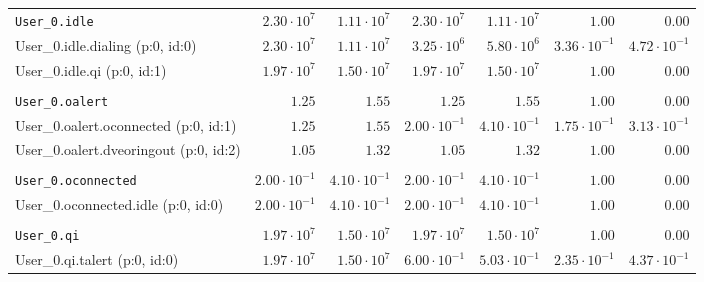 \begin{table}[htbp]
{\begin{tabular}{lrrrrrr}
\\[-8pt]\texttt{User\_0.idle}                         &  $2.30 \cdot 10^{7}$ &  $1.11 \cdot 10^{7}$ &  $2.30 \cdot 10^{7}$ &  $1.11 \cdot 10^{7}$ &               $1.00$ &               $0.00$ \\
\hspace{3mm}User\_0.idle.dialing (p:0, id:0)          &  $2.30 \cdot 10^{7}$ &  $1.11 \cdot 10^{7}$ &  $3.25 \cdot 10^{6}$ &  $5.80 \cdot 10^{6}$ & $3.36 \cdot 10^{-1}$ & $4.72 \cdot 10^{-1}$ \\
\hspace{3mm}User\_0.idle.qi (p:0, id:1)               &  $1.97 \cdot 10^{7}$ &  $1.50 \cdot 10^{7}$ &  $1.97 \cdot 10^{7}$ &  $1.50 \cdot 10^{7}$ &               $1.00$ &               $0.00$ \\
\\[-8pt]\texttt{User\_0.oalert}                       &               $1.25$ &               $1.55$ &               $1.25$ &               $1.55$ &               $1.00$ &               $0.00$ \\
\hspace{3mm}User\_0.oalert.oconnected (p:0, id:1)     &               $1.25$ &               $1.55$ & $2.00 \cdot 10^{-1}$ & $4.10 \cdot 10^{-1}$ & $1.75 \cdot 10^{-1}$ & $3.13 \cdot 10^{-1}$ \\
\hspace{3mm}User\_0.oalert.dveoringout (p:0, id:2)    &               $1.05$ &               $1.32$ &               $1.05$ &               $1.32$ &               $1.00$ &               $0.00$ \\
\\[-8pt]\texttt{User\_0.oconnected}                   & $2.00 \cdot 10^{-1}$ & $4.10 \cdot 10^{-1}$ & $2.00 \cdot 10^{-1}$ & $4.10 \cdot 10^{-1}$ &               $1.00$ &               $0.00$ \\
\hspace{3mm}User\_0.oconnected.idle (p:0, id:0)       & $2.00 \cdot 10^{-1}$ & $4.10 \cdot 10^{-1}$ & $2.00 \cdot 10^{-1}$ & $4.10 \cdot 10^{-1}$ &               $1.00$ &               $0.00$ \\
\\[-8pt]\texttt{User\_0.qi}                           &  $1.97 \cdot 10^{7}$ &  $1.50 \cdot 10^{7}$ &  $1.97 \cdot 10^{7}$ &  $1.50 \cdot 10^{7}$ &               $1.00$ &               $0.00$ \\
\hspace{3mm}User\_0.qi.talert (p:0, id:0)             &  $1.97 \cdot 10^{7}$ &  $1.50 \cdot 10^{7}$ & $6.00 \cdot 10^{-1}$ & $5.03 \cdot 10^{-1}$ & $2.35 \cdot 10^{-1}$ & $4.37 \cdot 10^{-1}$ \\

\end{tabular}}
\end{table}
